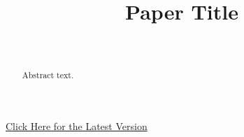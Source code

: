 \documentclass[ecta,nameyear,final]{econsocart}
\begin{document}
\pagestyle{fancy}
\fancyhead[L]{\thepage}

\begin{frontmatter}

\title{Paper Title}

\begin{aug}
\author[add1]{~}
\address[add1]{%
,
}
\href{URL_TO_LATEST_VERSION}{Click Here for the Latest Version}
\end{aug}

\begin{abstract}
Abstract text.
\end{abstract}

\begin{keyword}
\end{keyword}

\end{frontmatter}


\newpage
{}
\setcounter{page}{1}




\appendix



\newpage


\end{document}
